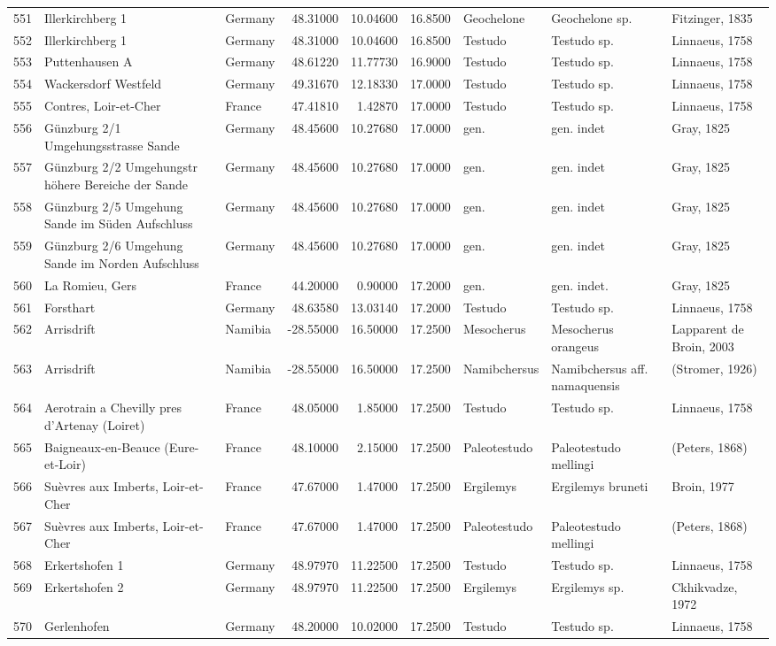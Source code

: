 \begin{landscape}
{\begin{longtable}[]{@{}lllrrrlll@{}}
551 & Illerkirchberg 1 & Germany & 48.31000 & 10.04600 & 16.8500 &
Geochelone & Geochelone sp. & Fitzinger, 1835\tabularnewline
552 & Illerkirchberg 1 & Germany & 48.31000 & 10.04600 & 16.8500 &
Testudo & Testudo sp. & Linnaeus, 1758\tabularnewline
553 & Puttenhausen A & Germany & 48.61220 & 11.77730 & 16.9000 & Testudo
& Testudo sp. & Linnaeus, 1758\tabularnewline
554 & Wackersdorf Westfeld & Germany & 49.31670 & 12.18330 & 17.0000 &
Testudo & Testudo sp. & Linnaeus, 1758\tabularnewline
555 & Contres, Loir-et-Cher & France & 47.41810 & 1.42870 & 17.0000 &
Testudo & Testudo sp. & Linnaeus, 1758\tabularnewline
556 & Günzburg 2/1 Umgehungsstrasse Sande & Germany & 48.45600 &
10.27680 & 17.0000 & gen. & gen. indet & Gray, 1825\tabularnewline
557 & Günzburg 2/2 Umgehungstr höhere Bereiche der Sande & Germany &
48.45600 & 10.27680 & 17.0000 & gen. & gen. indet & Gray,
1825\tabularnewline
558 & Günzburg 2/5 Umgehung Sande im Süden Aufschluss & Germany &
48.45600 & 10.27680 & 17.0000 & gen. & gen. indet & Gray,
1825\tabularnewline
559 & Günzburg 2/6 Umgehung Sande im Norden Aufschluss & Germany &
48.45600 & 10.27680 & 17.0000 & gen. & gen. indet & Gray,
1825\tabularnewline
560 & La Romieu, Gers & France & 44.20000 & 0.90000 & 17.2000 & gen. &
gen. indet. & Gray, 1825\tabularnewline
561 & Forsthart & Germany & 48.63580 & 13.03140 & 17.2000 & Testudo &
Testudo sp. & Linnaeus, 1758\tabularnewline
562 & Arrisdrift & Namibia & -28.55000 & 16.50000 & 17.2500 & Mesocherus
& Mesocherus orangeus & Lapparent de Broin, 2003\tabularnewline
563 & Arrisdrift & Namibia & -28.55000 & 16.50000 & 17.2500 &
Namibchersus & Namibchersus aff. namaquensis & (Stromer,
1926)\tabularnewline
564 & Aerotrain a Chevilly pres d'Artenay (Loiret) & France & 48.05000 &
1.85000 & 17.2500 & Testudo & Testudo sp. & Linnaeus,
1758\tabularnewline
565 & Baigneaux-en-Beauce (Eure-et-Loir) & France & 48.10000 & 2.15000 &
17.2500 & Paleotestudo & Paleotestudo mellingi & (Peters,
1868)\tabularnewline
566 & Suèvres aux Imberts, Loir-et-Cher & France & 47.67000 & 1.47000 &
17.2500 & Ergilemys & Ergilemys bruneti & Broin, 1977\tabularnewline
567 & Suèvres aux Imberts, Loir-et-Cher & France & 47.67000 & 1.47000 &
17.2500 & Paleotestudo & Paleotestudo mellingi & (Peters,
1868)\tabularnewline
568 & Erkertshofen 1 & Germany & 48.97970 & 11.22500 & 17.2500 & Testudo
& Testudo sp. & Linnaeus, 1758\tabularnewline
569 & Erkertshofen 2 & Germany & 48.97970 & 11.22500 & 17.2500 &
Ergilemys & Ergilemys sp. & Ckhikvadze, 1972\tabularnewline
570 & Gerlenhofen & Germany & 48.20000 & 10.02000 & 17.2500 & Testudo &
Testudo sp. & Linnaeus, 1758\tabularnewline

\end{longtable}}
\end{landscape}
